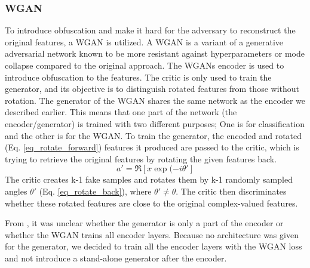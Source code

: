 \subsubsection{WGAN}
To introduce obfuscation and make it hard for the adversary to reconstruct the original features, a WGAN is utilized. A WGAN is a variant of a generative adversarial network known to be more resistant against hyperparameters or mode collapse compared to the original approach. The WGANs encoder is used to introduce obfuscation to the features. The critic is only used to train the generator, and its objective is to distinguish rotated features from those without rotation. The generator of the WGAN shares the same network as the encoder we described earlier. This means that one part of the network (the encoder/generator) is trained with two different purposes; One is for classification and the other is for the WGAN. To train the generator, the encoded and rotated (Eq. \ref{eq_rotate_forward}) features it produced are passed to the critic, which is trying to retrieve the original features by rotating the given features back. 
\begin{equation}
    a' = \Re[x \exp(-i\theta']
    \label{eq_rotate_back}
\end{equation}
The critic creates k-1 fake samples and rotates them by k-1 randomly sampled angles $\theta'$ (Eq. \ref{eq_rotate_back}), where $\theta'\neq\theta$. The critic then discriminates whether these rotated features are close to the original complex-valued features.

From  \citet{xiang2020interpretable}, it was unclear whether the generator is only a part of the encoder or whether the WGAN trains all encoder layers. Because no architecture was given for the generator, we decided to train all the encoder layers with the WGAN loss and not introduce a stand-alone generator after the encoder.



